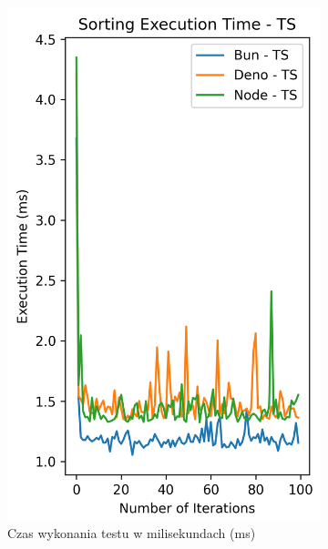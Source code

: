 \begin{figure}[H]
  \centering
  \begin{subfigure}[b]{0.42\textwidth}
    \centering
    \includegraphics[width=\textwidth]{Figures/sorting/sorting_bubble_100_1000_ts_time.png}
    \caption{Czas wykonania testu w milisekundach (ms)}
    \label{fig:bubble_sorting_e1_ts_time}
  \end{subfigure}
  \begin{subfigure}[b]{0.42\textwidth}
    \centering

\end{subfigure}
\end{figure}
